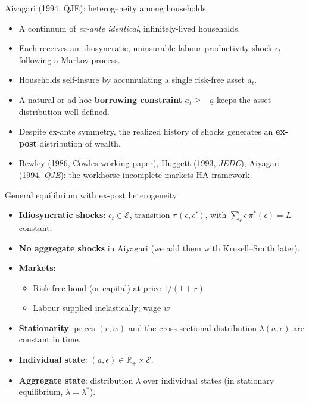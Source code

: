 \begin{frame}{Aiyagari (1994, QJE): heterogeneity among households}
\begin{itemize}
\item A continuum of \emph{ex-ante identical}, infinitely-lived households.
\medskip
\item Each receives an idiosyncratic, uninsurable labour-productivity shock $\epsilon_t$ following a Markov process.
\medskip
\item Households self-insure by accumulating a single risk-free asset $a_t$.
\medskip
\item A natural or ad-hoc \textbf{borrowing constraint} $a_t \geq -\underline{a}$ keeps the asset distribution well-defined.
\medskip
\item Despite ex-ante symmetry, the realized history of shocks generates an \textbf{ex-post} distribution of wealth.
\medskip
\item Bewley (1986, Cowles working paper), Huggett (1993, \emph{JEDC}), Aiyagari (1994, \emph{QJE}): the workhorse incomplete-markets HA framework.
\end{itemize}
\end{frame}

\begin{frame}{General equilibrium with ex-post heterogeneity}
\begin{itemize}
\item \textbf{Idiosyncratic shocks}: $\epsilon_t \in \mathcal{E}$, transition $\pi(\epsilon,\epsilon')$, with $\sum_{\epsilon}\epsilon\,\pi^*(\epsilon)=L$ constant.
\item \textbf{No aggregate shocks} in Aiyagari (we add them with Krusell--Smith later).
\item \textbf{Markets}:
  \begin{itemize}
  \item Risk-free bond (or capital) at price $1/(1+r)$
  \item Labour supplied inelastically; wage $w$
  \end{itemize}
\item \textbf{Stationarity}: prices $(r,w)$ and the cross-sectional distribution $\lambda(a,\epsilon)$ are constant in time.
\item \textbf{Individual state}: $(a,\epsilon) \in \mathbb{R}_+ \times \mathcal{E}$.
\item \textbf{Aggregate state}: distribution $\lambda$ over individual states (in stationary equilibrium, $\lambda=\lambda^*$).
\end{itemize}
\end{frame}

